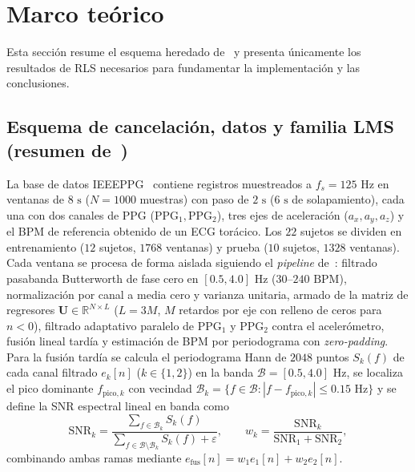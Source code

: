 \documentclass[conference]{IEEEtran}
\newcommand{\secUC}[1]{#1}
\newcommand{\secUC}[1]{\texorpdfstring{\MakeUppercase{#1}}{#1}}
\begin{document}
\section{\secUC{Marco teórico}}
\label{sec:teoria}

Esta sección resume el esquema heredado de~\cite{informe1} y presenta únicamente los resultados de RLS necesarios para fundamentar la implementación y las conclusiones.

\subsection{Esquema de cancelación, datos y familia LMS (resumen de~\cite{informe1})}
\label{sec:esq}

La base de datos IEEEPPG~\cite{tan2020ieeeppg} contiene registros muestreados a $f_s=125\text{ Hz}$ en ventanas de $8\text{ s}$ ($N=1000$ muestras) con paso de $2\text{ s}$ ($6\text{ s}$ de solapamiento), cada una con dos canales de PPG ($\text{PPG}_1, \text{PPG}_2$), tres ejes de aceleración ($a_x,a_y,a_z$) y el BPM de referencia obtenido de un ECG torácico. Los $22$ sujetos se dividen en entrenamiento ($12$ sujetos, $1768$ ventanas) y prueba ($10$ sujetos, $1328$ ventanas). Cada ventana se procesa de forma aislada siguiendo el \textit{pipeline} de~\cite{informe1}: filtrado pasabanda Butterworth de fase cero en $[0.5,4.0]\text{ Hz}$ ($30$--$240\text{ BPM}$), normalización por canal a media cero y varianza unitaria, armado de la matriz de regresores $\mathbf{U}\in\mathbb{R}^{N\times L}$ ($L=3M$, $M$ retardos por eje con relleno de ceros para $n<0$), filtrado adaptativo paralelo de $\text{PPG}_1$ y $\text{PPG}_2$ contra el acelerómetro, fusión lineal tardía y estimación de BPM por periodograma con \textit{zero-padding}. Para la fusión tardía se calcula el periodograma Hann de $2048$ puntos $S_k(f)$ de cada canal filtrado $e_k[n]$ ($k\in\{1,2\}$) en la banda $\mathcal{B}=[0.5,4.0]\text{ Hz}$, se localiza el pico dominante $f_{\text{pico},k}$ con vecindad $\mathcal{B}_k=\{f\in\mathcal{B}:|f-f_{\text{pico},k}|\le 0.15\text{ Hz}\}$ y se define la SNR espectral lineal en banda como
\begin{equation}
\text{SNR}_k = \frac{\sum_{f\in\mathcal{B}_k} S_k(f)}{\sum_{f\in\mathcal{B}\setminus\mathcal{B}_k} S_k(f)+\varepsilon},
\qquad w_k = \frac{\text{SNR}_k}{\text{SNR}_1+\text{SNR}_2},
\label{eq:snr_fusion}
\end{equation}
combinando ambas ramas mediante $e_{\text{fus}}[n]=w_1 e_1[n]+w_2 e_2[n]$.
\end{document}
